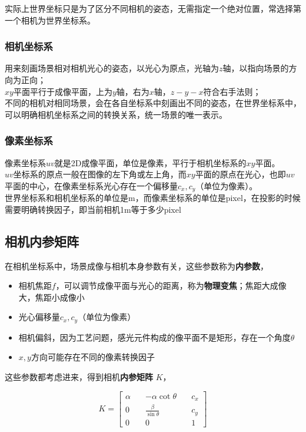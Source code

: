 \documentclass[hpyerref,UTF8,a4paper,titlepage,12pt,oneside]{ctexbook}
\theoremstyle{definition}
\begin{document}
		实际上世界坐标只是为了区分不同相机的姿态，无需指定一个绝对位置，常选择第一个相机为世界坐标系。

	\subsubsection*{相机坐标系}
		用来刻画场景相对相机光心的姿态，以光心为原点，光轴为$z$轴，以指向场景的方向为正向；\\

		$xy$平面平行于成像平面，上为$y$轴，右为$x$轴，$z-y-x$符合右手法则；\\

		不同的相机对相同场景，会在各自坐标系中刻画出不同的姿态，在世界坐标系中，可以明确相机坐标系之间的转换关系，统一场景的唯一表示。

	\subsubsection*{像素坐标系}
		像素坐标系$uv$就是2D成像平面，单位是像素，平行于相机坐标系的$xy$平面。\\

		$uv$坐标系的原点一般在图像的左下角或左上角，而$xy$平面的原点在光心，也即$uv$平面的中心，在像素坐标系光心存在一个偏移量$c_x,c_y$（单位为像素）。\\

		世界坐标系和相机坐标系的单位是m，而像素坐标系的单位是pixel，在投影的时候需要明确转换因子，即当前相机1m等于多少pixel

\subsection{相机内参矩阵}
	在相机坐标系中，场景成像与相机本身参数有关，这些参数称为\textbf{内参数}，

	\begin{itemize}
		\item 相机焦距$f$，可以调节成像平面与光心的距离，称为\textbf{物理变焦}；焦距大成像大，焦距小成像小
		\item 光心偏移量$c_x,c_y$（单位为像素）
		\item 相机偏斜，因为工艺问题，感光元件构成的像平面不是矩形，存在一个角度$\theta$
		\item $x,y$方向可能存在不同的像素转换因子
	\end{itemize}

	这些参数都考虑进来，得到相机\textbf{内参矩阵} $K$，

	\begin{equation}
		K = \begin{bmatrix}
			\alpha \quad& -\alpha\cot\theta        \quad& c_x\\
			0      \quad& \frac{\beta}{\sin\theta} \quad& c_y\\
			0      \quad& 0                        \quad& 1
		\end{bmatrix}
	\end{equation}
\end{document}
